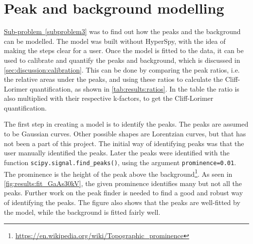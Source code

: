 \section{Peak and background modelling}
\label{sec:discussion:modelling}


\hyperref[subproblem3]{Sub-problem~\ref*{subproblem3}} was to find out how the peaks and the background can be modelled.
The model was built without HyperSpy, with the idea of making the steps clear for a user.
Once the model is fitted to the data, it can be used to calibrate and quantify the peaks and background, which is discussed in \cref{sec:discussion:calibration}.
This can be done by comparing the peak ratios, i.e. the relative areas under the peaks, and using these ratios to calculate the Cliff-Lorimer quantification, as shown in \cref{tab:results:ratios}.
In the table the ratio is also multiplied with their respective k-factors, to get the Cliff-Lorimer quantification.

The first step in creating a model is to identify the peaks.
The peaks are assumed to be Gaussian curves.
Other possible shapes are Lorentzian curves, but that has not been a part of this project.
The initial way of identifying peaks was that the user manually identified the peaks.
Later the peaks were identified with the function \verb|scipy.signal.find_peaks()|, using the argument \verb|prominence=0.01|.
The prominence is the height of the peak above the background\footnote{\url{https://en.wikipedia.org/wiki/Topographic_prominence}}.
As seen in \cref{fig:results:fit_GaAs30kV}, the given prominence identifies many but not all the peaks.
Further work on the peak finder is needed to find a good and robust way of identifying the peaks.
The figure also shows that the peaks are well-fitted by the model, while the background is fitted fairly well.



